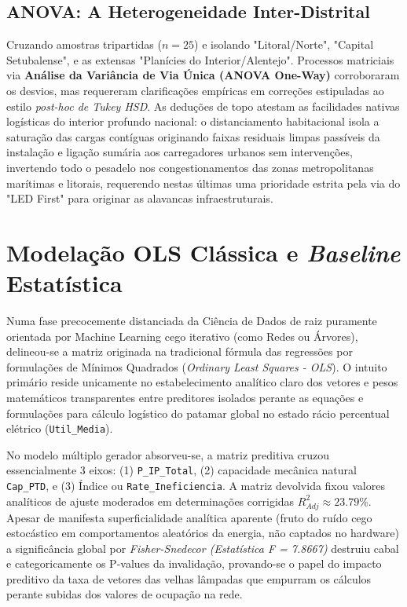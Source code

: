 \documentclass[conference]{IEEEtran}
\begin{document}
\subsection{ANOVA: A Heterogeneidade Inter-Distrital}
Cruzando amostras tripartidas ($n=25$) e isolando "Litoral/Norte", "Capital Setubalense", e as extensas "Planícies do Interior/Alentejo". Processos matriciais via \textbf{Análise da Variância de Via Única (ANOVA One-Way)} corroboraram os desvios, mas requereram clarificações empíricas em correções estipuladas ao estilo \textit{post-hoc de Tukey HSD}. As deduções de topo atestam as facilidades nativas logísticas do interior profundo nacional: o distanciamento habitacional isola a saturação das cargas contíguas originando faixas residuais limpas passíveis da instalação e ligação sumária aos carregadores urbanos sem intervenções, invertendo todo o pesadelo nos congestionamentos das zonas metropolitanas marítimas e litorais, requerendo nestas últimas uma prioridade estrita pela via do "LED First" para originar as alavancas infraestruturais.


\section{Modelação OLS Clássica e \textit{Baseline} Estatística}
Numa fase precocemente distanciada da Ciência de Dados de raiz puramente orientada por Machine Learning cego iterativo (como Redes ou Árvores), delineou-se a matriz originada na tradicional fórmula das regressões por formulações de Mínimos Quadrados (\textit{Ordinary Least Squares - OLS}). O intuito primário reside unicamente no estabelecimento analítico claro dos vetores e pesos matemáticos transparentes entre preditores isolados perante as equações e formulações para cálculo logístico do patamar global no estado rácio percentual elétrico (\texttt{Util\_Media}).

No modelo múltiplo gerador absorveu-se, a matriz preditiva cruzou essencialmente 3 eixos: (1) \texttt{P\_IP\_Total}, (2) capacidade mecânica natural \texttt{Cap\_PTD}, e (3) Índice ou \texttt{Rate\_Ineficiencia}.
A matriz devolvida fixou valores analíticos de ajuste moderados em determinações corrigidas $R_{Adj}^2 \approx 23.79\%$. Apesar de manifesta superficialidade analítica aparente (fruto do ruído cego estocástico em comportamentos aleatórios da energia, não captados no hardware) a significância global por \textit{Fisher-Snedecor (Estatística F = 7.8667)} destruiu cabal e categoricamente os P-values da invalidação, provando-se o papel do impacto preditivo da taxa de vetores das velhas lâmpadas que empurram os cálculos perante subidas dos valores de ocupação na rede.
\end{document}

